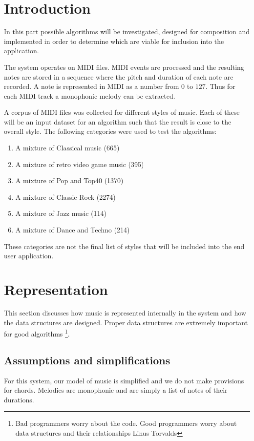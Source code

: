 

\chapter{Introduction}
In this part possible algorithms will be investigated, designed for composition and implemented in order to determine which are viable for inclusion into the application.

The system operates on MIDI files. MIDI events are processed and the resulting notes are stored in a sequence where the pitch and duration of each note are recorded. A note is represented in MIDI as a number from $0$ to $127$.
Thus for each MIDI track a monophonic melody can be extracted.

A corpus of MIDI files was collected for different styles of music. Each of these will be an input dataset for an algorithm such that the result is close to the overall style.
The following categories were used to test the algorithms:
\begin{enumerate}
\item A mixture of Classical music (665)
\item A mixture of retro video game music (395)
\item A mixture of Pop and Top40 (1370)
\item A mixture of Classic Rock (2274)
\item A mixture of Jazz music (114)
\item A mixture of Dance and Techno (214)
\end{enumerate}

These categories are not the final list of styles that will be included into the end user application.


\chapter{Representation}
This section discusses how music is represented internally in the system and how the data structures are designed. 
Proper data structures are extremely important for good algorithms \footnote{Bad programmers worry about the code. Good programmers worry about data structures and their relationships \mytilde Linus Torvalds}.

\section{Assumptions and simplifications}
For this system, our model of music is simplified and we do not make provisions for chords. Melodies are monophonic and are simply a list of notes of their durations.


